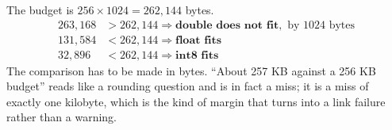 The budget is $256 \times 1024 = 262{,}144$ bytes.
\begin{align*}
  263{,}168 &> 262{,}144 \Rightarrow \textbf{double does not fit}, \text{ by } 1024 \text{ bytes} \\
  131{,}584 &< 262{,}144 \Rightarrow \textbf{float fits} \\
  32{,}896 &< 262{,}144 \Rightarrow \textbf{int8 fits}
\end{align*}
The comparison has to be made in bytes. ``About 257 KB against a 256 KB budget'' reads like a
rounding question and is in fact a miss; it is a miss of exactly one kilobyte, which is the kind of
margin that turns into a link failure rather than a warning. 
